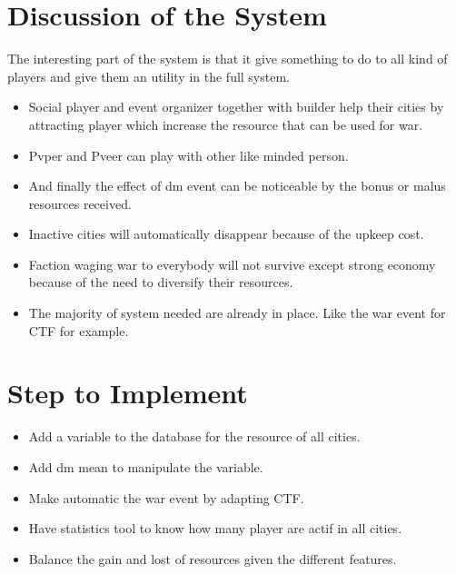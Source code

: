 \documentclass{article}
\begin{document}
\section{Discussion of the System}
The interesting part of the system is that it give something to do to all kind of players and give them an utility in the full system.
\begin{itemize}
	\item Social player and event organizer together with builder help their cities by attracting player which increase the resource that can be used for war.
	\item Pvper and Pveer can play with other like minded person.
	\item And finally the effect of dm event can be noticeable by the bonus or malus resources received.
	\item Inactive cities will automatically disappear because of the upkeep cost.
	\item Faction waging war to everybody will not survive except strong economy because of the need to diversify their resources. 
	\item The majority of system needed are already in place. Like the war event for CTF for example.
\end{itemize}

\section{Step to Implement}
\begin{itemize}
	\item Add a variable to the database for the resource of all cities.
	\item Add dm mean to manipulate the variable.
	\item Make automatic the war event by adapting CTF.
	\item Have statistics tool to know how many player are actif in all cities.
	\item Balance the gain and lost of resources given the different features.
\end{itemize}
\end{document}
